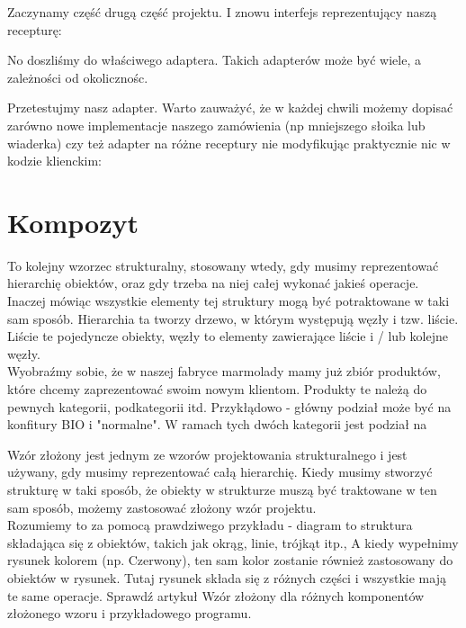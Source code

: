 \documentclass[12pt,a4paper]{article}
\begin{document}
	
	Zaczynamy część drugą część projektu. I znowu interfejs reprezentujący naszą recepturę:
	
	No doszliśmy do właściwego adaptera. Takich adapterów może być wiele, a zależności od okolicznośc.
	
	Przetestujmy nasz adapter. Warto zauważyć, że w każdej chwili możemy dopisać zarówno nowe implementacje naszego zamówienia (np mniejszego słoika lub wiaderka) czy też adapter na różne receptury nie modyfikując praktycznie nic w kodzie klienckim:
	
	\section{Kompozyt}
	To kolejny wzorzec strukturalny, stosowany wtedy, gdy musimy reprezentować hierarchię obiektów, oraz gdy trzeba na niej całej wykonać jakieś operacje. Inaczej mówiąc wszystkie elementy tej struktury mogą być potraktowane w taki sam sposób. Hierarchia ta tworzy drzewo, w którym występują węzły i tzw. liście. Liście te pojedyncze obiekty, węzły to elementy zawierające liście i / lub kolejne węzły.\\
	Wyobraźmy sobie, że w naszej fabryce marmolady mamy już zbiór produktów, które chcemy zaprezentować swoim nowym klientom. Produkty te należą do pewnych kategorii, podkategorii itd. Przykłądowo - główny podział może być na konfitury BIO i "normalne". W ramach tych dwóch kategorii jest podział na
	
	
	Wzór złożony jest jednym ze wzorów projektowania strukturalnego i jest używany, gdy musimy reprezentować całą hierarchię. Kiedy musimy stworzyć strukturę w taki sposób, że obiekty w strukturze muszą być traktowane w ten sam sposób, możemy zastosować złożony wzór projektu.\\
	Rozumiemy to za pomocą prawdziwego przykładu - diagram to struktura składająca się z obiektów, takich jak okrąg, linie, trójkąt itp., A kiedy wypełnimy rysunek kolorem (np. Czerwony), ten sam kolor zostanie również zastosowany do obiektów w rysunek. Tutaj rysunek składa się z różnych części i wszystkie mają te same operacje. Sprawdź artykuł Wzór złożony dla różnych komponentów złożonego wzoru i przykładowego programu\cite{PankajKumar}.
\end{document}
